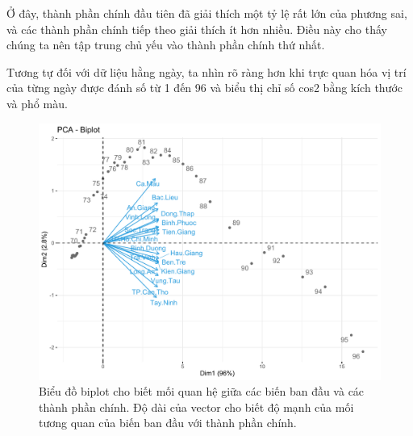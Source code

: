 \documentclass[../thesis.tex]{subfiles}
\begin{document}
Ở đây, thành phần chính đầu tiên đã giải thích một tỷ lệ rất lớn của phương sai, và các thành phần chính tiếp theo giải thích ít hơn nhiều. Điều này cho thấy chúng ta nên tập trung chủ yếu vào  thành phần chính thứ nhất. 




\newpage
\begin{Shaded}
	\begin{Highlighting}[]
\SpecialCharTok{\%\textgreater{}\%}\SpecialCharTok{::}
		 \NormalTok{,}
		 \NormalTok{,}
		 \NormalTok{)}
	\end{Highlighting}
\end{Shaded}

Tương tự đối với dữ liệu hằng ngày, ta nhìn rõ ràng hơn khi trực quan hóa vị trí của từng ngày được đánh số từ 1 đến 96 và biểu thị chỉ số cos2 bằng kích thước và phổ màu.
\begin{figure}[H]
	\centering
	\includegraphics[width=0.75\linewidth]{images/biplot_cul}
	\caption[Biểu đồ biplot cho dữ liệu hằng ngày]{Biểu đồ biplot cho biết mối quan hệ giữa các biến ban đầu và các thành phần chính. Độ dài của vector cho biết độ mạnh của mối tương quan của biến ban đầu với thành phần chính.}
	\label{fig:biplotcul}
\end{figure}

\begin{Shaded}
	\begin{Highlighting}[]
\SpecialCharTok{\%\textgreater{}\%} 
		 \NormalTok{,}
		 \NormalTok{,}
		 \NormalTok{(}\NormalTok{, }\NormalTok{, }\NormalTok{),}
		 \NormalTok{) }
	\end{Highlighting}
\end{Shaded}
\end{document}
